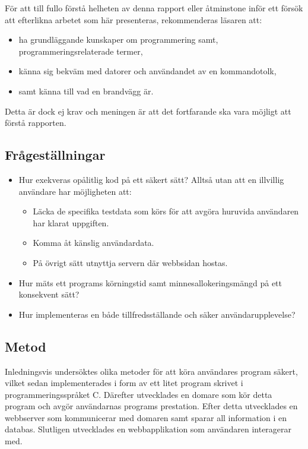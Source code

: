 \documentclass{article}
\begin{document}
För att till fullo förstå helheten av denna rapport eller åtminstone inför ett
försök att efterlikna arbetet som här presenteras, rekommenderas läsaren att:

\begin{itemize}
	\item ha grundläggande kunskaper om programmering samt,
		programmeringsrelaterade termer,
	\item känna sig bekväm med datorer och användandet av en kommandotolk,
	\item samt känna till vad en brandvägg är.
\end{itemize}

Detta är dock ej krav och meningen är att det fortfarande ska vara möjligt att
förstå rapporten.

\subsection{Frågeställningar}

\begin{itemize}
	\item Hur exekveras opålitlig kod på ett säkert sätt? Alltså utan att en
		illvillig användare har möjligheten att:
		\begin{itemize}
			\item Läcka de specifika testdata som körs för att avgöra huruvida
				användaren har klarat uppgiften.
			\item Komma åt känslig användardata.
			\item På övrigt sätt utnyttja servern där webbsidan hostas.
		\end{itemize}
	\item
		Hur mäts ett programs körningstid samt minnesallokeringsmängd på ett
		konsekvent sätt?
	\item
		Hur implementeras en både tillfredsställande och säker
		användarupplevelse?

\end{itemize}

\subsection{Metod}

Inledningsvis undersöktes olika metoder för att köra användares program säkert,
vilket sedan implementerades i form av ett litet program skrivet i
programmeringsspråket C. Därefter utvecklades en domare som kör detta program
och avgör användarnas programs prestation. Efter detta utvecklades en webbserver
som kommunicerar med domaren samt sparar all information i en databas. Slutligen
utvecklades en webbapplikation som användaren interagerar med.
\end{document}
